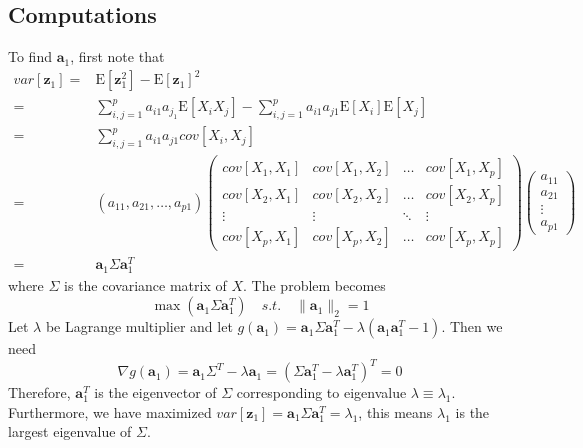 \documentclass{article}
\begin{document}
        \subsection{Computations}
            To find $\mathbf{a}_1$, first note that
            \begin{align*}
                var[\textbf{z}_1]=&\mathrm{E}[\mathbf{z}_1^2]-\mathrm{E}[\mathbf{z}_1]^2\\
                                =&\sum_{i,j=1}^pa_{i1}a_{j_1}\mathrm{E}[X_iX_j]-\sum_{i,j=1}^pa_{i1}a_{j1}\mathrm{E}[X_i]\mathrm{E}[X_j]\\
                                =&\sum_{i,j=1}^pa_{i1}a_{j1}cov[X_i,X_j]\\
                                =&(a_{11},a_{21},\dots,a_{p1})
                                \begin{pmatrix}
                                    cov[X_1,X_1] & cov[X_1,X_2] & \dots & cov[X_1,X_p]\\
                                    cov[X_2,X_1] & cov[X_2,X_2] & \dots & cov[X_2,X_p]\\
                                    \vdots & \vdots & \ddots & \vdots \\
                                    cov[X_p,X_1] & cov[X_p,X_2] & \dots & cov[X_p,X_p]
                                \end{pmatrix}
                                \begin{pmatrix}
                                    a_{11} \\ a_{21} \\ \vdots \\ a_{p1}
                                \end{pmatrix}\\
                                =&\mathbf{a}_1\Sigma\mathbf{a}_1^T
            \end{align*}
            where $\Sigma$ is the covariance matrix of $X$. The problem becomes
            \[
                \max(\mathbf{a}_1\Sigma\mathbf{a}_1^T) \quad s.t.\quad \|\mathbf{a}_1\|_2=1
            \]
            Let $\lambda$ be Lagrange multiplier and let $g(\mathbf{a}_1)=\mathbf{a}_1\Sigma\mathbf{a}_1^T-\lambda(\mathbf{a}_1\mathbf{a}_1^T-1)$. Then we need
            \[
                \nabla g(\mathbf{a}_1)=\mathbf{a}_1\Sigma^T-\lambda\mathbf{a}_1=(\Sigma\mathbf{a}_1^T-\lambda\mathbf{a}_1^T)^T=0
            \]
            Therefore, $\mathbf{a}_1^T$ is the eigenvector of $\Sigma$ corresponding to eigenvalue $\lambda\equiv\lambda_1$. Furthermore, we have maximized $var[\mathbf{z}_1]=\mathbf{a}_1\Sigma\mathbf{a}_1^T=\lambda_1$, this means $\lambda_1$ is the largest eigenvalue of $\Sigma$.
            
\end{document}
